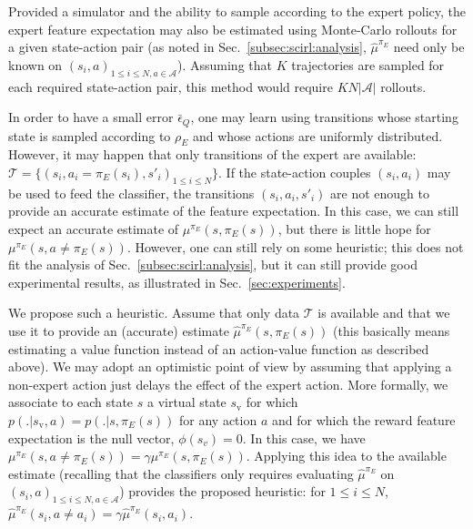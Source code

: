 \documentclass[english,utf8]{./hermes-journal}
\newcommand{\A}{\mathcal{A}}
\newcommand{\T}{\mathcal{T}}
\begin{document}
%
Provided a simulator and the ability to sample according to the
expert policy, the expert feature expectation may also be estimated
using Monte-Carlo rollouts for a given state-action pair (as noted
in Sec.~\ref{subsec:scirl:analysis}, $\hat{\mu}^{\pi_E}$ need only
be known on $(s_i,a)_{1\leq i\leq N,a\in\A}$). Assuming that $K$
trajectories are sampled for each required state-action pair, this
method would require $KN|\A|$ rollouts.

In order to have a small error $\bar{\epsilon}_Q$, one may learn
using transitions whose starting state is sampled according to
$\rho_E$ and whose actions are uniformly distributed. However, it
may happen that only transitions of the expert are available: $\T =
\{(s_i,a_i=\pi_E(s_i),s'_i)_{1\leq i \leq N}\}$. If the state-action
couples $(s_i,a_i)$ may be used to feed the classifier, the
transitions $(s_i,a_i,s'_i)$ are not enough to provide an accurate
estimate of the feature expectation. In this case, we can still
expect an accurate estimate of $\mu^{\pi_E}(s,\pi_E(s))$, but there
is little hope for $\mu^{\pi_E}(s,a\neq\pi_E(s))$. However, one can
still rely on some heuristic; this does not fit the analysis of
Sec.~\ref{subsec:scirl:analysis}, but it can still provide good
experimental results, as illustrated in Sec.~\ref{sec:experiments}.


We propose such a heuristic. Assume that only data $\T$ is available
and that we use it to provide an (accurate) estimate
$\hat{\mu}^{\pi_E}(s,\pi_E(s))$ (this basically means estimating a
value function instead of an action-value function as described
above). We may adopt an optimistic point of view by assuming that
applying a non-expert action just delays the effect of the expert
action. More formally, we associate to each state $s$ a virtual
state $s_\text{v}$ for which $p(.|s_\text{v},a)=p(.|s,\pi_E(s))$ for
any action $a$ and for which the reward feature expectation is the
null vector, $\phi(s_v) = 0$. In this case, we have
$\mu^{\pi_E}(s,a\neq\pi_E(s)) = \gamma \mu^{\pi_E}(s,\pi_E(s))$.
Applying this idea to the available estimate (recalling that the
classifiers only requires evaluating $\hat{\mu}^{\pi_E}$ on
$(s_i,a)_{1\leq i\leq N,a\in \A}$) provides the proposed heuristic:
for $1\leq i\leq N$, $\hat{\mu}^{\pi_E}(s_i,a\neq a_i) = \gamma
\hat{\mu}^{\pi_E}(s_i,a_i)$.
\end{document}
